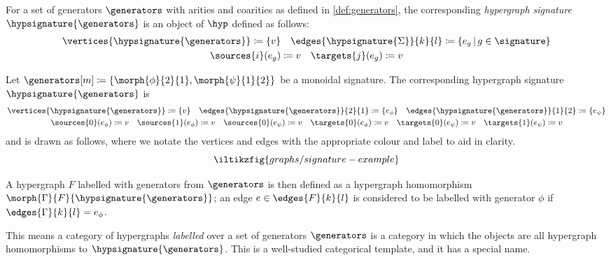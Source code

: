 \begin{definition}
    For a set of generators \(\generators\) with arities and coarities as defined
    in \cref{def:generators}, the corresponding \emph{hypergraph signature}
    \(\hypsignature{\generators}\) is an object of \(\hyp\) defined as follows:
    \begin{gather*}
        \vertices{\hypsignature{\generators}}
        \coloneqq
        \{ v \}
        \quad
        \edges{\hypsignature{\Sigma}}{k}{l}
        \coloneqq
        \{ e_g \,|\, g \in \signature\}
        \\
        \sources{i}(e_g) \coloneqq v
        \quad
        \targets{j}(e_g) \coloneqq v
    \end{gather*}
\end{definition}

\begin{example}\label{ex:labelled-hypergraph-signature}
    Let \(\generators[m] \coloneqq \{\morph{\phi}{2}{1}, \morph{\psi}{1}{2}\}\)
    be a monoidal signature.
    The corresponding hypergraph signature \(\hypsignature{\generators}\) is
    \begin{gather*}
        \vertices{\hypsignature{\generators}} \coloneqq \{v\}
        \quad
        \edges{\hypsignature{\generators}}{2}{1} \coloneqq \{e_\phi\}
        \quad
        \edges{\hypsignature{\generators}}{1}{2} \coloneqq \{e_\psi\}
        \\
        \sources{0}(e_\phi) \coloneqq v
        \quad
        \sources{1}(e_\phi) \coloneqq v
        \quad
        \sources{0}(e_\psi) \coloneqq v
        \quad
        \targets{0}(e_\phi) \coloneqq v
        \quad
        \targets{0}(e_\psi) \coloneqq v
        \quad
        \targets{1}(e_\psi) \coloneqq v
    \end{gather*}
    and is drawn as follows, where we notate the vertices and edges with the
    appropriate colour and label to aid in clarity.
    \[
        \iltikzfig{graphs/signature-example}
    \]
\end{example}

A hypergraph \(F\) labelled with generators from \(\generators\) is then defined
as a hypergraph homomorphism \(\morph{\Gamma}{F}{\hypsignature{\generators}}\);
an edge \(e \in \edges{F}{k}{l}\) is considered to be labelled with generator
\(\phi\) if \(\edges{\Gamma}{k}{l} = e_\phi\).

This means a category of hypergraphs \emph{labelled} over a set of generators
\(\generators\) is a category in which the objects are all hypergraph
homomorphisms to \(\hypsignature{\generators}\).
This is a well-studied categorical template, and it has a special name.

